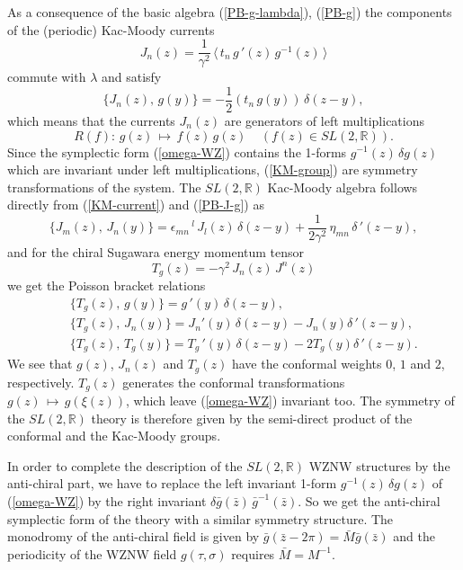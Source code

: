 \documentclass[a4paper,12pt]{article}
\newcommand{\rr}{\mathbb{R}}
\begin{document}
\noindent
As a consequence of the basic algebra (\ref{PB-g-lambda}), (\ref{PB-g})
the components of the (periodic) Kac-Moody currents
\begin{equation}\label{KM-current}
J_n (z)=\frac{1}{\gamma^2}\,\langle\,t_n\, g\,'(z)\, g^{-1}(z)\,\rangle
\end{equation}
commute with $\lambda$ and satisfy
\begin{equation}\label{PB-J-g}
\{J_n (z),\, g (y)\} = -\frac{1}{2}(t_n\, g (y))\,\delta (z-y),
\end{equation}
which means that the currents $J_n(z)$ are generators of left multiplications
\begin{equation}\label{KM-group}
R(f): \,g(z)\,\mapsto \, f(z)\,g(z)~~~~~(f(z)\in SL(2,\rr)).
\end{equation}
Since the symplectic form (\ref{omega-WZ}) contains the 1-forms
$g^{-1}(z)\,\delta g(z)$ which are invariant under left multiplications,
(\ref{KM-group}) are symmetry transformations of the system.
The $SL(2,\rr)$ Kac-Moody algebra follows directly from (\ref{KM-current})
and (\ref{PB-J-g}) as
\begin{equation}\label{KM-algebra}
\{J_m (z),\, J_n (y)\} = \epsilon_{mn}\,^l\,J_l (z)\,\delta (z-y)
+\frac{1}{2\gamma^2}\,\eta_{mn}\,\delta\,'(z-y),
\end{equation}
and for the chiral Sugawara energy momentum tensor
\begin{equation}\label{T-WZ}
T_g (z)= -\gamma^2\, J_n(z)\,J^n(z)
\end{equation}
we get the Poisson bracket relations
\begin{eqnarray}\label{PB-T-g}
&&\{T_g (z),\, g (y)\} =  g\,' (y)\,\delta (z-y),\\
\label{PB-T-J}
&&\{T_g (z),\, J_n (y)\} = J_n'(y)\,
\delta (z-y) -J_n(y)\delta\,' (z-y),\\
\label{PB-T-T}
&&\{T_g (z),\, T_g (y)\} = T_g\,'(y)\,\delta (z-y) -2T_g(y)\delta\,'(z-y).
\end{eqnarray}
We see that $g(z)$, $J_n(z)$ and
$T_g(z)$ have the conformal weights $0$, $1$ and $2$, respectively.
$T_g(z)$ generates the conformal transformations
$ g(z)\,\mapsto \,g(\xi(z))$,
which leave (\ref{omega-WZ}) invariant too. The symmetry of the
$SL(2,\rr)$ theory is therefore given by the semi-direct product of the
conformal and the Kac-Moody groups.

\noindent
In order to complete the description of the $SL(2,\rr)$ WZNW
structures by the anti-chiral part, we have to replace the left
invariant 1-form $g^{-1}(z)\,\delta g(z)$ of (\ref{omega-WZ}) by the
right invariant $\delta \bar g(\bar z)\,\bar g^{-1}(\bar z)$. So we
get the anti-chiral symplectic form of the theory with a similar
symmetry structure. The monodromy of the anti-chiral field
is given by $\bar g(\bar z-2\pi)=\bar M\bar g(\bar z)$ and the
periodicity of the WZNW field $g(\tau,\sigma)$ requires $\bar M= M
^{-1}$.
\end{document}
